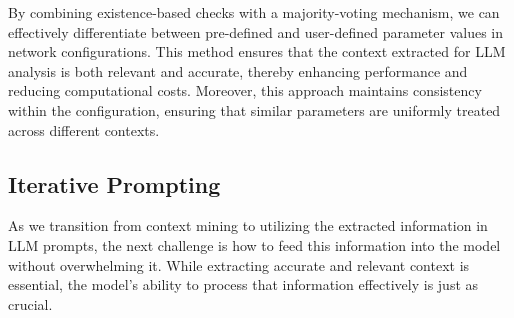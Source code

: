 By combining existence-based checks with a majority-voting mechanism, we can effectively differentiate between pre-defined and user-defined parameter values in network configurations. This method ensures that the context extracted for LLM analysis is both relevant and accurate, thereby enhancing performance and reducing computational costs. Moreover, this approach maintains consistency within the configuration, ensuring that similar parameters are uniformly treated across different contexts.


\subsection{Iterative Prompting}\label{prompting_method}
As we transition from context mining to utilizing the extracted information in LLM prompts, the next challenge is how to feed this information into the model without overwhelming it. While extracting accurate and relevant context is essential, the model's ability to process that information effectively is just as crucial.


